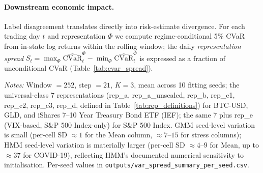 \documentclass[preprint,12pt,authoryear]{elsarticle}
\newcommand{\SPX}{S\&P 500 Index}
\newcommand{\IEF}{iShares 7--10 Year Treasury Bond ETF (IEF)}
\begin{document}
\paragraph{Downstream economic impact.}
Label disagreement translates directly into risk-estimate divergence. For each trading day $t$ and representation $\Phi$ we compute regime-conditional 5\% CVaR from in-state log returns within the rolling window; the daily \emph{representation spread} $S_t = \max_\Phi \widehat{\mathrm{CVaR}}_t^\Phi - \min_\Phi \widehat{\mathrm{CVaR}}_t^\Phi$ is expressed as a fraction of unconditional CVaR (Table~\ref{tab:cvar_spread}).

\begin{table}[!htbp]
\centering
\small
\setlength{\tabcolsep}{5pt}
\caption{Regime-conditional CVaR spread across representations as \% of unconditional CVaR at 5\%.
Spread $=$ max$-$min conditional CVaR across admissible representations on each trading day: 7 for BTC-USD, GLD, and IEF; 8 for S\&P 500 (which additionally includes rep\_e, VIX-based).}
\label{tab:cvar_spread}
\par\medskip
\footnotesize
\parbox{\linewidth}{\textit{Notes:} Window $=252$, step $=21$, $K=3$, mean across 10 fitting seeds; the universal-class 7 representations (rep\_a, rep\_a\_unscaled, rep\_b, rep\_c1, rep\_c2, rep\_c3, rep\_d, defined in Table~\ref{tab:rep_definitions}) for BTC-USD, GLD, and \IEF{}; the same 7 plus rep\_e (VIX-based, \SPX{}-only) for \SPX{}. GMM seed-level variation is small (per-cell SD $\approx 1$ for the Mean column, $\approx 7$--$15$ for stress columns); HMM seed-level variation is materially larger (per-cell SD $\approx 4$--$9$ for Mean, up to $\approx 37$ for COVID-19), reflecting HMM's documented numerical sensitivity to initialisation. Per-seed values in \texttt{outputs/var\_spread\_summary\_per\_seed.csv}.
}
\end{table}
\end{document}
